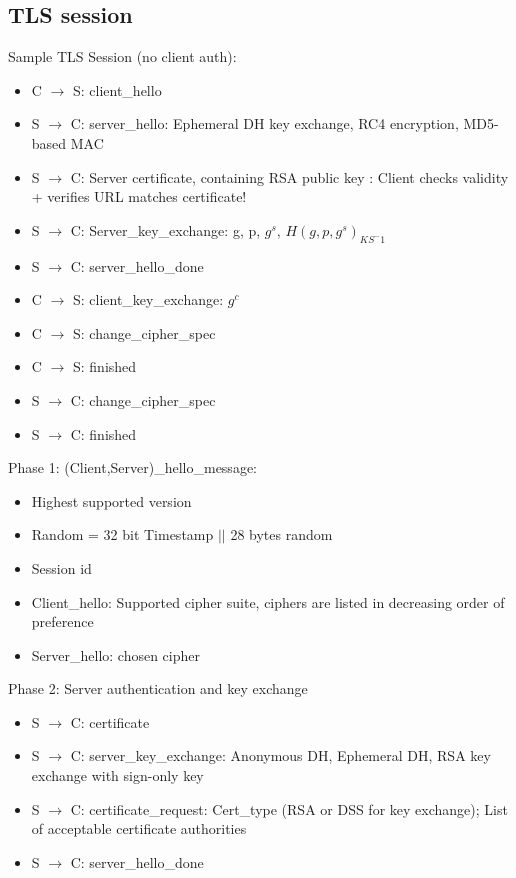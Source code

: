 \documentclass[english, leagacyboxes, nologo]{latex4ei/latex4ei_sheet}
\begin{document}
{  \subsection{TLS session}
  Sample TLS Session (no client auth):
  \begin{itemize}
  \item C $\rightarrow$ S:  client\_hello
  \item S $\rightarrow$ C:  server\_hello: Ephemeral DH  key exchange,   RC4 encryption,  MD5-based   MAC
  \item S $\rightarrow$ C:  Server  certificate, containing  RSA public  key : Client checks  validity + verifies URL matches certificate!
  \item S $\rightarrow$ C:  Server\_key\_exchange: g, p, $g^s$, ${H(g, p, g^s)}_{KS^-1}$
  \item S $\rightarrow$ C:  server\_hello\_done
  \item C $\rightarrow$ S:  client\_key\_exchange: $g^c$
  \item C $\rightarrow$ S:  change\_cipher\_spec
  \item C $\rightarrow$ S:  finished
  \item S $\rightarrow$ C:  change\_cipher\_spec
  \item S $\rightarrow$ C:  finished
  \end{itemize}

  Phase 1: (Client,Server)\_hello\_message:
  \begin{itemize}
  \item Highest   supported   version
  \item Random    =   32  bit Timestamp  $||$  28  bytes   random
  \item Session   id
  \item Client\_hello: Supported   cipher  suite,  ciphers are listed
  in  decreasing  order   of  preference
  \item Server\_hello: chosen  cipher
  \end{itemize}

  Phase 2:  Server  authentication    and key exchange
  \begin{itemize}
  \item S $\rightarrow$ C:  certificate
  \item S $\rightarrow$ C:  server\_key\_exchange: Anonymous DH, Ephemeral   DH, RSA key exchange    with    sign-only   key
  \item S $\rightarrow$ C:  certificate\_request: Cert\_type (RSA    or  DSS for key exchange); List  of  acceptable  certificate  authorities
  \item S $\rightarrow$ C:  server\_hello\_done
  \end{itemize}

}
\end{document}
